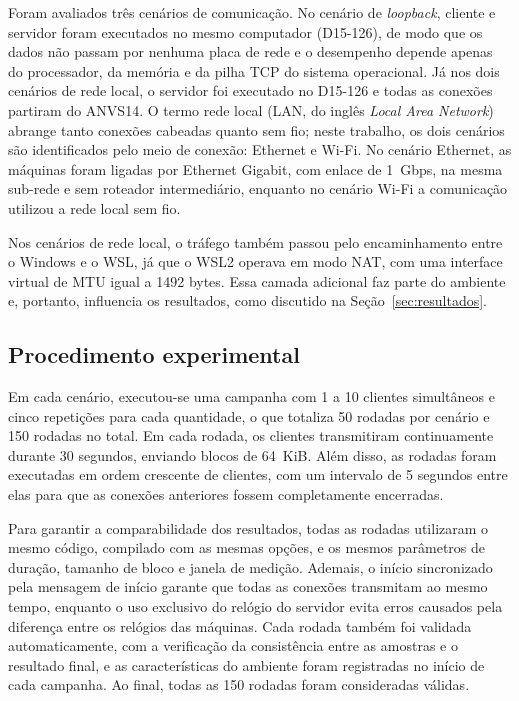 \documentclass[12pt]{article}
\begin{document}
Foram avaliados três cenários de comunicação. No cenário de \textit{loopback},
cliente e servidor foram executados no mesmo computador (D15-126), de modo que
os dados não passam por nenhuma placa de rede e o desempenho depende apenas do
processador, da memória e da pilha TCP do sistema operacional. Já nos dois
cenários de rede local, o servidor foi executado no D15-126 e todas as conexões
partiram do ANVS14. O termo rede local (LAN, do inglês \textit{Local Area
Network}) abrange tanto conexões cabeadas quanto sem fio; neste trabalho, os
dois cenários são identificados pelo meio de conexão: Ethernet e Wi-Fi.
No cenário Ethernet, as máquinas foram ligadas por Ethernet
Gigabit, com enlace de 1~Gbps, na mesma sub-rede e sem roteador intermediário,
enquanto no cenário Wi-Fi a comunicação utilizou a rede local sem fio.

Nos cenários de rede local, o tráfego também passou pelo encaminhamento entre o
Windows e o WSL, já que o WSL2 operava em modo NAT, com uma interface virtual de
MTU igual a 1492 bytes. Essa camada adicional faz parte do ambiente e,
portanto, influencia os resultados, como discutido na
Seção~\ref{sec:resultados}.

\subsection{Procedimento experimental}

Em cada cenário, executou-se uma campanha com 1 a 10 clientes simultâneos e
cinco repetições para cada quantidade, o que totaliza 50 rodadas por cenário e
150 rodadas no total. Em cada rodada, os clientes transmitiram continuamente
durante 30 segundos, enviando blocos de 64~KiB. Além disso, as rodadas foram
executadas em ordem crescente de clientes, com um intervalo de 5 segundos entre
elas para que as conexões anteriores fossem completamente encerradas.

Para garantir a comparabilidade dos resultados, todas as rodadas utilizaram o
mesmo código, compilado com as mesmas opções, e os mesmos parâmetros de
duração, tamanho de bloco e janela de medição. Ademais, o início sincronizado
pela mensagem de início garante que todas as conexões transmitam ao mesmo
tempo, enquanto o uso exclusivo do relógio do servidor evita erros causados
pela diferença entre os relógios das máquinas. Cada rodada também foi validada
automaticamente, com a verificação da consistência entre as amostras e o
resultado final, e as características do ambiente foram registradas no início
de cada campanha. Ao final, todas as 150 rodadas foram consideradas válidas.
\end{document}
